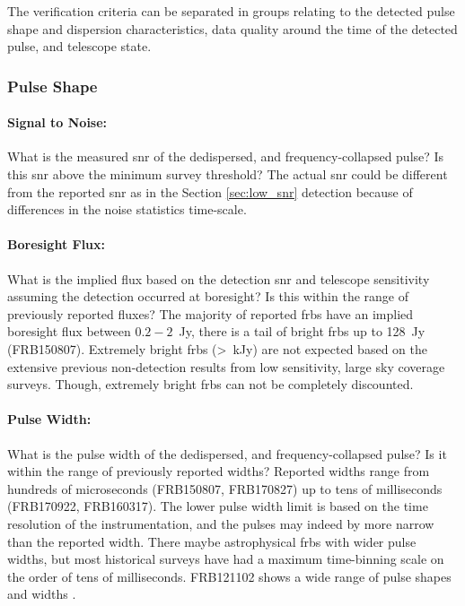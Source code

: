 \documentclass[a4paper,fleqn,usenatbib]{mnras}
\begin{document}
The verification criteria can be separated in groups relating to the detected
pulse shape and dispersion characteristics, data quality around the time of the
detected pulse, and telescope state.

\subsubsection{Pulse Shape}


\paragraph{Signal to Noise:}

What is the measured \gls{snr} of the dedispersed, and frequency-collapsed pulse?
Is this \gls{snr} above the minimum survey threshold? The actual \gls{snr} could
be different from the reported \gls{snr} as in the Section \ref{sec:low_snr}
detection because of differences in the noise statistics time-scale.

\paragraph{Boresight Flux:}

What is the implied flux based on the detection \gls{snr} and telescope
sensitivity assuming the detection occurred at boresight? Is this within the
range of previously reported fluxes? The majority of reported \glspl{frb} have
an implied boresight flux between $0.2-2$~Jy, there is a tail of bright
\glspl{frb} up to 128~Jy (FRB150807). Extremely bright \glspl{frb} (>~kJy) are
not expected based on the extensive previous non-detection results from low
sensitivity, large sky coverage surveys. Though, extremely bright \glspl{frb}
can not be completely discounted.

\paragraph{Pulse Width:}

What is the pulse width of the dedispersed, and frequency-collapsed pulse? Is it
within the range of previously reported widths? Reported widths range from
hundreds of microseconds (FRB150807, FRB170827) up to tens of milliseconds
(FRB170922, FRB160317). The lower pulse width limit is based on the time
resolution of the instrumentation, and the pulses may indeed by more narrow than
the reported width. There maybe astrophysical \glspl{frb} with wider pulse
widths, but most historical surveys have had a maximum time-binning scale on the
order of tens of milliseconds. FRB121102 shows a wide range of pulse shapes and
widths \citep{2018Natur.553..182M,atel10675}.
\end{document}
